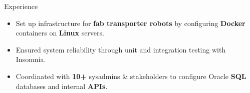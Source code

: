 \documentclass{resume} %
\begin{document}
\begin{workSection}{Experience}
	
	\experienceItem[
	company=Capital One,
	location=McLean{,} VA,
	position=Incoming Software Engineering Intern,
	duration= June 2025 - August 2025,
	]
	
	\experienceItem[
	company=Texas Instruments,
	location=Dallas{,} TX,
	position=Information Technology Intern,
	duration= May 2024 - August 2024,
	]
	\begin{itemize}
	\vspace{-0.5em}
	\itemsep -6pt {}
	\item Set up infrastructure for \textbf{fab transporter robots} by configuring \textbf{Docker} containers on \textbf{Linux} servers.
	\item Ensured system reliability through unit and integration testing with Insomnia.
	\item Coordinated with \textbf{10+} sysadmins \& stakeholders to configure Oracle \textbf{SQL} databases and internal \textbf{APIs}.
	\end{itemize}
	

\end{workSection}
\end{document}

